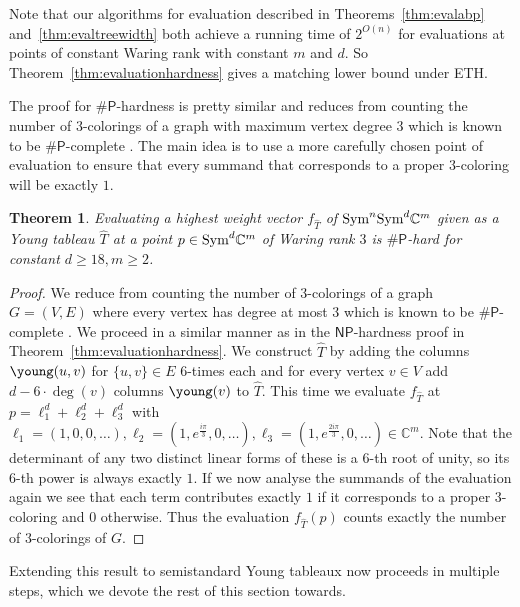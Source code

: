 \documentclass[10pt,a4paper]{article}
\numberwithin{equation}{section}
\newtheorem{theorem}[equation]{Theorem}
\theoremstyle{definition}
\newcommand{\Sym}{\textup{Sym}}
\newcommand{\IC}{\mathbb{C}}
\newcommand{\PP}{\ensuremath{\mathsf{P}}}
\newcommand{\NP}{\ensuremath{\mathsf{NP}}}
\begin{document}
Note that our algorithms for evaluation described in Theorems~\ref{thm:evalabp} and~\ref{thm:evaltreewidth} both achieve a running time of $2^{O(n)}$ for evaluations at points of constant Waring rank with constant $m$ and $d$.
So Theorem~\ref{thm:evaluationhardness} gives a matching lower bound under ETH.

The proof for $\#\PP$-hardness is pretty similar and reduces from counting the number of $3$-colorings of a graph with maximum vertex degree $3$ which is known to be $\#\PP$-complete \cite{DBLP:journals/siamcomp/BubleyDGJ99}.
The main idea is to use a more carefully chosen point of evaluation to ensure that every summand that corresponds to a proper $3$-coloring will be exactly $1$.


\begin{theorem}
    \label{thm:evaluationsharpphardness}
    Evaluating a highest weight vector $f_{\hat{T}}$ of $\Sym^n\Sym^d \IC^m$ given as a Young tableau $\hat{T}$ at a point $p \in \Sym^d \IC^m$ of Waring rank $3$ is $\#\PP$-hard for constant $d \geq 18, m \geq 2$.
\end{theorem}

\begin{proof}
    We reduce from counting the number of $3$-colorings of a graph $G=(V, E)$ where every vertex has degree at most $3$ which is known to be $\#\PP$-complete \cite{DBLP:journals/siamcomp/BubleyDGJ99}.
    We proceed in a similar manner as in the $\NP$-hardness proof in Theorem~\ref{thm:evaluationhardness}.
    We construct $\hat{T}$ by adding the columns {\scriptsize $\young(u,v)$} for $\{u,v\} \in E$ $6$-times each and for every vertex $v \in V$ add $d-6\cdot\deg(v)$ columns {\scriptsize $\young(v)$} to $\hat{T}$.
    This time we evaluate $f_{\hat{T}}$ at $p = \ell_1^d + \ell_2^d + \ell_3^d$ with $\ell_1 = (1, 0, 0, \ldots), \ell_2 = (1, e^{\frac{i\pi}{3}}, 0, \ldots), \ell_3 = (1, e^{\frac{2i\pi}{3}}, 0, \ldots) \in \IC^m$.
    Note that the determinant of any two distinct linear forms of these is a $6$-th root of unity, so its $6$-th power is always exactly $1$.
    If we now analyse the summands of the evaluation again we see that each term contributes exactly $1$ if it corresponds to a proper $3$-coloring and $0$ otherwise.
    Thus the evaluation $f_{\hat{T}}(p)$ counts exactly the number of $3$-colorings of $G$.
\end{proof}

Extending this result to semistandard Young tableaux now proceeds in multiple steps, which we devote the rest of this section towards.
\end{document}
